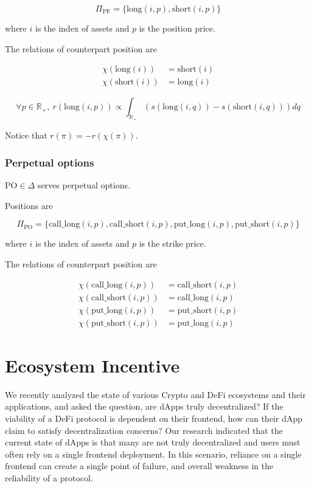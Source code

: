 \documentclass[dvipdfmx]{jsarticle}
\begin{document}
$$
  \Pi_{\text{PF}} = \{\text{long}(i, p), \text{short}(i, p)\}
$$

where $i$ is the index of assets and $p$ is the position price.

The relations of counterpart position are

$$
\begin{aligned}
  \chi(\text{long}(i)) & = \text{short}(i) \\
  \chi(\text{short}(i)) & = \text{long}(i)
\end{aligned}
$$

$$
  \forall p \in \mathbb{R}_+, \ r(\text{long}(i, p)) \propto \int_{\mathbb{R}_+} (s(\text{long}(i, q)) - s(\text{short}(i, q))) dq
$$

Notice that $r(\pi) = -r(\chi(\pi))$.

\subsubsection{Perpetual options}

$\text{PO} \in \Delta$ serves perpetual options.

Positions are

$$
  \Pi_{\text{PO}} = \{\text{call\_long}(i, p), \text{call\_short}(i, p), \text{put\_long}(i, p), \text{put\_short}(i, p)\}
$$

where $i$ is the index of assets and $p$ is the strike price.

The relations of counterpart position are

$$
\begin{aligned}
  \chi(\text{call\_long}(i, p)) & = \text{call\_short}(i, p) \\
  \chi(\text{call\_short}(i, p)) & = \text{call\_long}(i, p) \\
  \chi(\text{put\_long}(i, p)) & = \text{put\_short}(i, p) \\
  \chi(\text{put\_short}(i, p)) & = \text{put\_long}(i, p)
\end{aligned}
$$

\section{Ecosystem Incentive}
We recently analyzed the state of various Crypto and DeFi ecosystems and their applications, and asked the question, are dApps truly decentralized? 
If the viability of a DeFi protocol is dependent on their frontend, how can their dApp claim to satisfy decentralization concerns? 
Our research indicated that the current state of dApps is that many are not truly decentralized and users must often rely on a single frontend deployment. 
In this scenario, reliance on a single frontend can create a single point of failure, and overall weakness in the reliability of a protocol.
\end{document}
